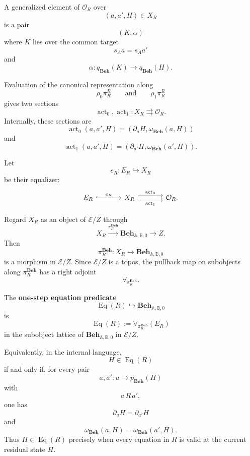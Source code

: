 A generalized element of \(\mathcal O_R\) over
\[
    (a,a',H)\in X_R
\]
is a pair
\[
    (K,\alpha)
\]
where \(K\) lies over the common target
\[
    s_Aa=s_Aa'
\]
and
\[
    \alpha:q_{\mathbf{Beh}}(K)\to q_{\mathbf{Beh}}(H).
\]

Evaluation of the canonical representation along
\[
    \rho_0\pi_R^R
    \qquad\text{and}\qquad
    \rho_1\pi_R^R
\]
gives two sections
\[
    \operatorname{act}_0,
    \operatorname{act}_1:
    X_R\rightrightarrows\mathcal O_R.
\]
Internally, these sections are
\[
    \operatorname{act}_0(a,a',H)
    =
    \left(
        \partial_aH,
        \omega_{\mathbf{Beh}}(a,H)
    \right)
\]
and
\[
    \operatorname{act}_1(a,a',H)
    =
    \left(
        \partial_{a'}H,
        \omega_{\mathbf{Beh}}(a',H)
    \right).
\]

Let
\[
    e_R:E_R\hookrightarrow X_R
\]
be their equalizer:
\[
\begin{tikzcd}[column sep=large]
    E_R
        \arrow[r, hook, "e_R"]
    &
    X_R
        \arrow[r, shift left=.7ex, "\operatorname{act}_0"]
        \arrow[r, shift right=.7ex, "\operatorname{act}_1"']
    &
    \mathcal O_R.
\end{tikzcd}
\]

Regard \(X_R\) as an object of \(\mathcal E/Z\) through
\[
    X_R
    \xrightarrow{\pi_R^{\mathbf{Beh}}}
    \mathbf{Beh}_{\mathbb A,\mathbb B,0}
    \to
    Z.
\]
Then
\[
    \pi_R^{\mathbf{Beh}}:
    X_R\to
    \mathbf{Beh}_{\mathbb A,\mathbb B,0}
\]
is a morphism in \(\mathcal E/Z\). Since \(\mathcal E/Z\) is a topos, the
pullback map on subobjects along \(\pi_R^{\mathbf{Beh}}\) has a right
adjoint
\[
    \forall_{\pi_R^{\mathbf{Beh}}}.
\]

\begin{definition}
\label{def:to-equation-predicate}
    The \textbf{one-step equation predicate}
    \[
        \operatorname{Eq}(R)
        \hookrightarrow
        \mathbf{Beh}_{\mathbb A,\mathbb B,0}
    \]
    is
    \[
        \operatorname{Eq}(R)
        :=
        \forall_{\pi_R^{\mathbf{Beh}}}(E_R)
    \]
    in the subobject lattice of
    \(\mathbf{Beh}_{\mathbb A,\mathbb B,0}\) in \(\mathcal E/Z\).
\end{definition}

Equivalently, in the internal language,
\[
    H\in\operatorname{Eq}(R)
\]
if and only if, for every pair
\[
    a,a':u\to p_{\mathbf{Beh}}(H)
\]
with
\[
    a\,R\,a',
\]
one has
\[
    \partial_aH=\partial_{a'}H
\]
and
\[
    \omega_{\mathbf{Beh}}(a,H)
    =
    \omega_{\mathbf{Beh}}(a',H).
\]
Thus \(H\in\operatorname{Eq}(R)\) precisely when every equation in \(R\) is
valid at the current residual state \(H\).

